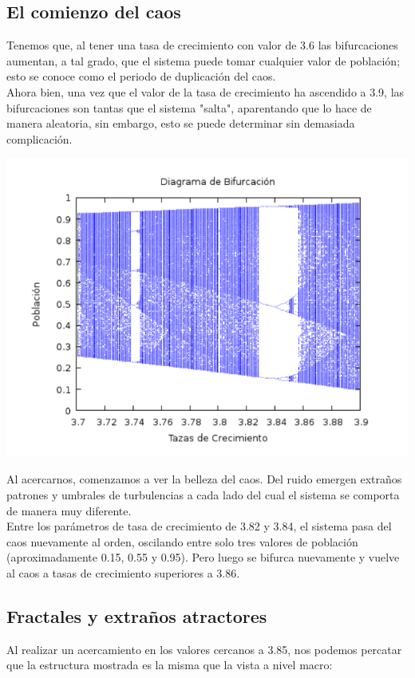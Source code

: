 \documentclass{article}
\begin{document}
\subsection{El comienzo del caos}
Tenemos que, al tener una tasa de crecimiento con valor de 3.6 las bifurcaciones aumentan, a tal grado, que el sistema puede tomar cualquier valor de población; esto se conoce como el periodo de duplicación del caos. \\
Ahora bien, una vez que el valor de la tasa de crecimiento ha ascendido a 3.9, las bifurcaciones son tantas que el sistema "salta", aparentando que lo hace de manera aleatoria, sin embargo, esto se puede determinar sin demasiada complicación.
\begin{center}
\includegraphics[scale=0.6]{Act104.PNG}
\end{center}
Al acercarnos, comenzamos a ver la belleza del caos. Del ruido emergen extraños patrones y umbrales de turbulencias a cada lado del cual el sistema se comporta de manera muy diferente. 
\\
Entre los parámetros de tasa de crecimiento de 3.82 y 3.84, el sistema pasa del caos nuevamente al orden, oscilando entre solo tres valores de población (aproximadamente 0.15, 0.55 y 0.95). Pero luego se bifurca nuevamente y vuelve al caos a tasas de crecimiento superiores a 3.86.

\subsection{Fractales y extraños atractores}
Al realizar un acercamiento en los valores cercanos a 3.85, nos podemos percatar que la estructura mostrada es la misma que la vista a nivel macro:
\end{document}
